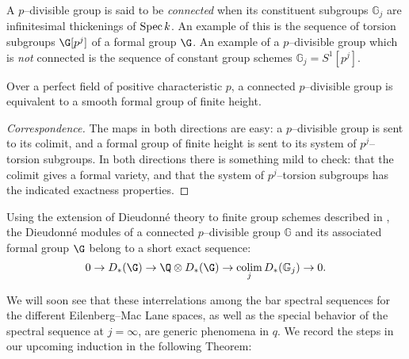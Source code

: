 \begin{definition}
A \(p\)--divisible group is said to be \textit{connected} when its constituent subgroups \(\mathbb G_j\) are infinitesimal thickenings of \(\operatorname{Spec} k\).  An example of this is the sequence of torsion subgroups \(\G[p^j]\) of a formal group \(\G\).  An example of a \(p\)--divisible group which is \emph{not} connected is the sequence of constant group schemes \(\mathbb G_j = S^1[p^j]\).
\end{definition}

\begin{lemma}
Over a perfect field of positive characteristic \(p\), a connected \(p\)--divisible group is equivalent to a smooth formal group of finite height.
\end{lemma}
\begin{proof}[Correspondence]
The maps in both directions are easy: a \(p\)--divisible group is sent to its colimit, and a formal group of finite height is sent to its system of \(p^j\)--torsion subgroups.  In both directions there is something mild to check: that the colimit gives a formal variety, and that the system of \(p^j\)--torsion subgroups has the indicated exactness properties.
\end{proof}

\begin{remark}\label{DieudonneModsForPDivVsFormal}
Using the extension of Dieudonn\'e theory to finite group schemes described in , the Dieudonn\'e modules of a connected \(p\)--divisible group \(\mathbb G\) and its associated formal group \(\G\) belong to a short exact sequence: \[0 \to D_*(\G) \to \Q \otimes D_*(\G) \to \colim_j D_*(\mathbb G_j) \to 0.\]
\end{remark}

We will soon see that these interrelations among the bar spectral sequences for the different Eilenberg--Mac Lane spaces, as well as the special behavior of the spectral sequence at \(j = \infty\), are generic phenomena in \(q\).  We record the steps in our upcoming induction in the following Theorem:

